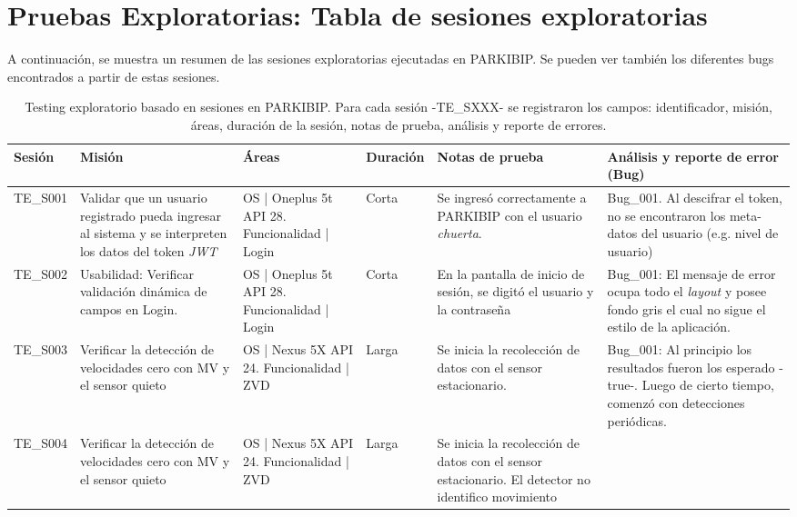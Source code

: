 \chapter{Pruebas Exploratorias: Tabla de sesiones exploratorias}\label{apendice:exploratory-tests}

A continuación, se muestra un resumen de las sesiones exploratorias ejecutadas en PARKIBIP. Se pueden ver también los diferentes bugs encontrados a partir de estas sesiones.

\fontsize{9}{11}\selectfont
\setlength\LTleft{-2.5cm}
\begin{longtable}{| p{1.5cm} | p{3cm}| p{2cm}| p{1.5cm}| p{4cm} | p{4cm}|}
\caption{Testing exploratorio basado en sesiones en PARKIBIP. Para cada sesión -TE\_SXXX- se registraron los campos: identificador, misión, áreas, duración de la sesión, notas de prueba, análisis y reporte de errores.
}\\\hline
\label{tab:testing-exploratory}
\textbf{Sesión} & \textbf{Misión} & \textbf{Áreas} & \textbf{Duración} & \textbf{Notas de prueba} & \textbf{Análisis y reporte de error (Bug)} \\ \hline
\endhead
TE\_S001 & Validar que un usuario registrado pueda ingresar al sistema y se interpreten los datos del token \textit{JWT} & OS | Oneplus 5t API 28. Funcionalidad | Login & Corta & Se ingresó correctamente a PARKIBIP con el usuario \textit{chuerta}. & Bug\_001. Al descifrar el token, no se encontraron los meta-datos del usuario (e.g. nivel de usuario) \\ \hline
TE\_S002 & Usabilidad: Verificar validación dinámica de campos en Login. & OS | Oneplus 5t API 28. Funcionalidad | Login & Corta & En la pantalla de inicio de sesión, se digitó el usuario y la contraseña & Bug\_001: El mensaje de error ocupa todo el \textit{layout} y posee fondo gris el cual no sigue el estilo de la aplicación. \\ \hline
TE\_S003 & Verificar la detección de velocidades cero con MV  y el sensor quieto & OS | Nexus 5X API 24. Funcionalidad | ZVD & Larga & Se inicia la recolección de datos con el sensor estacionario. & Bug\_001: Al principio los resultados fueron los esperado -true-. Luego de cierto tiempo, comenzó con detecciones periódicas. \\ \hline
TE\_S004 & Verificar la detección de velocidades cero con MV  y el sensor quieto & OS | Nexus 5X API 24. Funcionalidad | ZVD & Larga & Se inicia la recolección de datos con el sensor estacionario. El detector no identifico movimiento &  \\ \hline

\end{longtable}
